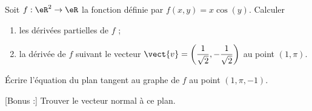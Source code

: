 \begin{exercice}\label{exodevoir2-0002}

Soit $f:\eR^2\to\eR$ la fonction définie par $f(x,y)=x\cos (y)$. Calculer
\begin{enumerate}
\item les dérivées partielles de $f$ ;
\item la dérivée de $f$ suivant le vecteur $\displaystyle \vect{ v }= \left(\frac{1}{\sqrt{2}},-\frac{1}{\sqrt{2}}\right)$ au point $(1,\pi)$.
\end{enumerate}
Écrire l'équation du plan tangent au graphe de $f$ au point $(1,\pi,-1)$. 

[Bonus :] Trouver le vecteur normal à ce plan.  
\end{exercice}
